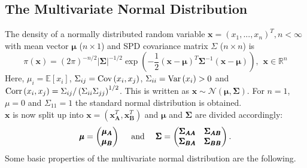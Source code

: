\subsection{The Multivariate Normal Distribution}
The density of a normally distributed random variable $\pmb{x}=\left(x_1,...,x_n\right)^T, n<\infty$ with mean vector $\pmb{\mu}$ ($n\times1$) and SPD covariance matrix $\Sigma$ ($n\times n$) is
\begin{equation}
    \pi\left(\pmb{x}\right)=\left(2\pi\right)^{-n/2}|\pmb{\Sigma}|^{-1/2}\exp\left(-\frac{1}{2}\left(\pmb{x}-\pmb{\mu}\right)^T\pmb{\Sigma}^{-1}\left(\pmb{x}-\pmb{\mu}\right)\right),\hspace{5pt}\pmb{x}\in\mathbb{R}^n
\end{equation}
Here, $\mu_i=\mathbb{E}\left[x_i\right]$, $ \Sigma_{ij}=\hbox{Cov}\left(x_i,x_j\right)$, $ \Sigma_{ii}=\hbox{Var}\left(x_i\right) > 0$ and $\hbox{Corr}\left(x_i,x_j\right)=\Sigma_{ij}/\left(\Sigma_{ii}\Sigma_{jj}\right)^{1/2}$. This is written as $\pmb{x}\sim\mathcal{N}\left(\pmb{\mu},\pmb{\Sigma}\right)$. For $n=1$, $\mu=0$ and $\Sigma_{11}=1$ the standard normal distribution is obtained. \\
$\pmb{x}$ is now split up into $\pmb{x}=\left(\pmb{x}_{\pmb{A}}^T,\pmb{x}_{\pmb{B}}^T\right)$ and $\pmb{\mu}$ and $\pmb{\Sigma}$ are divided accordingly:
\begin{equation*}
    \pmb{\mu} = \begin{pmatrix}\pmb{\mu}_{\pmb{A}} \\ \pmb{\mu}_{\pmb{B}}\end{pmatrix} \hspace{10pt}\hbox{ and }\hspace{10pt} \pmb{\Sigma}=\begin{pmatrix}\pmb{\Sigma}_{\pmb{AA}} & \pmb{\Sigma}_{\pmb{AB}}\\\pmb{\Sigma}_{\pmb{BA}} & \pmb{\Sigma}_{\pmb{BB}}\end{pmatrix}.
\end{equation*}
Some basic properties of the multivariate normal distribution are the following.
